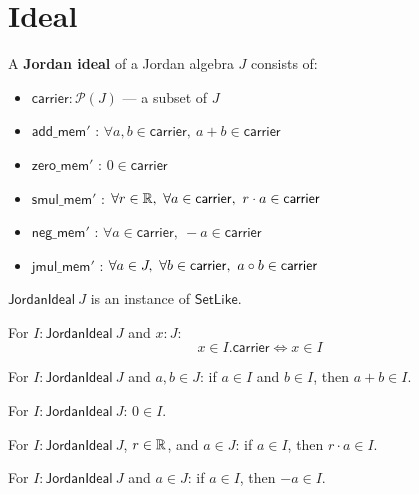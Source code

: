 \section{Ideal}

\begin{definition}[JordanIdeal]
A \textbf{Jordan ideal} of a Jordan algebra $J$ consists of:
\begin{itemize}
  \item $\mathsf{carrier} : \mathcal{P}(J)$ — a subset of $J$
  \item $\mathsf{add\_mem'}$ : $\forall a, b \in \mathsf{carrier},\ a + b \in \mathsf{carrier}$
  \item $\mathsf{zero\_mem'}$ : $0 \in \mathsf{carrier}$
  \item $\mathsf{smul\_mem'}$ : $\forall r \in \mathbb{R},\ \forall a \in \mathsf{carrier},\ r \cdot a \in \mathsf{carrier}$
  \item $\mathsf{neg\_mem'}$ : $\forall a \in \mathsf{carrier},\ -a \in \mathsf{carrier}$
  \item $\mathsf{jmul\_mem'}$ : $\forall a \in J,\ \forall b \in \mathsf{carrier},\ a \circ b \in \mathsf{carrier}$
\end{itemize}
\end{definition}

\begin{proposition}
$\mathsf{JordanIdeal}\ J$ is an instance of $\mathsf{SetLike}$.
\end{proposition}

\begin{lemma}
For $I : \mathsf{JordanIdeal}\ J$ and $x : J$:
\[ x \in I.\mathsf{carrier} \iff x \in I \]
\end{lemma}

\begin{theorem}
For $I : \mathsf{JordanIdeal}\ J$ and $a, b \in J$: if $a \in I$ and $b \in I$, then $a + b \in I$.
\end{theorem}

\begin{theorem}
For $I : \mathsf{JordanIdeal}\ J$: $0 \in I$.
\end{theorem}

\begin{theorem}
For $I : \mathsf{JordanIdeal}\ J$, $r \in \mathbb{R}$, and $a \in J$: if $a \in I$, then $r \cdot a \in I$.
\end{theorem}

\begin{theorem}
For $I : \mathsf{JordanIdeal}\ J$ and $a \in J$: if $a \in I$, then $-a \in I$.
\end{theorem}

